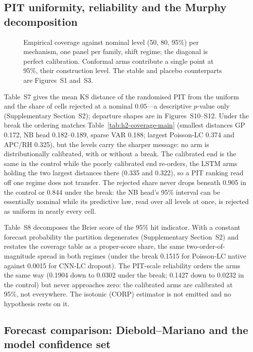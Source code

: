\subsection{PIT uniformity, reliability and the Murphy decomposition}


\begin{figure}[htbp]\centering
{}
\caption{Empirical coverage against nominal level (50, 80, 95\%) per mechanism,
one panel per family, shift regime; the diagonal is perfect calibration.
Conformal arms contribute a single point at 95\%, their construction level. The
stable and placebo counterparts are Figures~S1 and~S3.}
\label{fig:reliability}
\end{figure}

Table~S7 gives the mean KS distance of the randomised PIT from the uniform and
the share of cells rejected at a nominal $0.05$---a descriptive $p$-value only
(Supplementary Section~S2); departure shapes are in Figures~S10--S12. Under the
break the ordering matches Table~\ref{tab:h2-coverage-main} (smallest distances
GP 0.172, NB head 0.182--0.189, sparse VAR 0.188; largest Poisson-LC 0.374 and
APC/RH 0.325), but the levels carry the sharper message: no arm is
distributionally calibrated, with or without a break. The calibrated end is the
same in the control while the poorly calibrated end re-orders, the LSTM arms
holding the two largest distances there (0.335 and 0.322), so a PIT ranking read
off one regime does not transfer. The rejected share never drops beneath 0.905
in the control or 0.844 under the break: the NB head's 95\% interval can be
essentially nominal while its predictive law, read over all levels at once, is
rejected as uniform in nearly every cell.

Table~S8 decomposes the Brier score of the 95\% hit indicator. With a constant
forecast probability the partition degenerates (Supplementary Section~S2) and
restates the coverage table as a proper-score share, the same
two-order-of-magnitude spread in both regimes (under the break 0.1515 for
Poisson-LC native against 0.0015 for CNN-LC dropout). The PIT-scale reliability
orders the arms the same way (0.1904 down to 0.0302 under the break; 0.1427 down
to 0.0232 in the control) but never approaches zero: the calibrated arms are
calibrated at 95\%, not everywhere. The isotonic (CORP) estimator is not emitted
and no hypothesis rests on it.

\subsection{Forecast comparison: Diebold--Mariano and the model confidence set}

